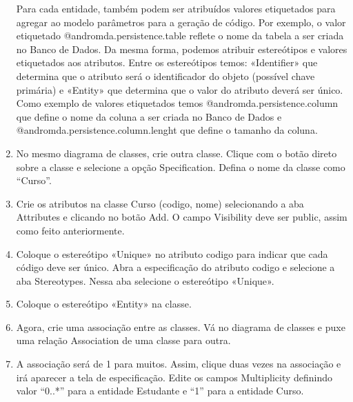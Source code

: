 \begin{enumerate}
	Para cada entidade, também podem ser atribuídos valores etiquetados para
	agregar ao modelo parâmetros para a geração de código. Por exemplo, o valor
	etiquetado @andromda.persistence.table reflete o nome da tabela a ser criada no
	Banco de Dados. Da mesma forma, podemos atribuir estereótipos e valores
	etiquetados aos atributos. Entre os estereótipos temos: «Identifier» que
	determina que o atributo será o identificador do objeto (possível chave
	primária) e «Entity» que determina que o valor do atributo deverá ser único.
	Como exemplo de valores etiquetados temos @andromda.persistence.column que
	define o nome da coluna a ser criada no Banco de Dados e
	@andromda.persistence.column.lenght que define o tamanho da coluna.

	\item No mesmo diagrama de classes, crie outra classe. Clique com o botão
	direto sobre a classe e selecione a opção Specification. Defina o nome da
	classe como “Curso”.
	
	\item Crie os atributos na classe Curso (codigo, nome) selecionando a  aba
	Attributes e clicando no botão Add. O campo Visibility deve ser public, assim
	como feito anteriormente.

	\item Coloque o estereótipo «Unique» no atributo codigo para indicar que cada
	código deve ser único. Abra a especificação do atributo codigo e selecione a
	aba Stereotypes. Nessa aba selecione o estereótipo «Unique».
	
	\item Coloque o estereótipo «Entity» na classe.
	
	\item Agora, crie uma associação entre as classes. Vá no diagrama de classes e
	puxe uma relação Association de uma classe para outra.
	
	\item A associação será de 1 para muitos. Assim, clique duas vezes na
	associação e irá aparecer a tela de especificação. Edite os campos Multiplicity
	definindo valor “0..*” para a entidade Estudante e “1” para a entidade Curso.
	

\end{enumerate}
